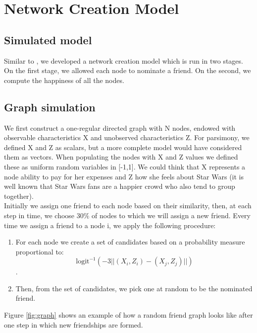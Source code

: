 \documentclass[11pt]{article}
\begin{document}
\section{Network Creation Model}
\label{Network Creation Model}

\subsection{Simulated model}

Similar to \cite{shalizi2011homophily}, we developed a network creation model which is run in two stages. On the first stage, we allowed each node to nominate a friend. On the second, we compute the happiness of all the nodes.

\subsection{Graph simulation}

We first construct a one-regular directed graph with N nodes, endowed with observable characteristics X and unobserved characteristics Z. For parsimony, we defined X and Z as scalars, but a more complete model would have considered them as vectors. When populating the nodes with X and Z values we defined these as uniform random variables in [-1,1]. We could think that X represents a node ability to pay for her expenses and Z how she feels about Star Wars (it is well known that Star Wars fans are a happier crowd who also tend to group together). \\

Initially we assign one friend to each node based on their similarity, then, at each step in time, we choose $30\%$ of nodes to which we will assign a new friend. Every time we assign a friend to a node i, we apply the following procedure:

\begin{enumerate}
\item For each node we create a set of candidates based on a probability measure proportional to: $$\text{logit}^{-1} \left(-3||(X_i,Z_i)-(X_j,Z_j)||\right)$$.
\item Then, from the set of candidates, we pick one at random to be the nominated friend.
\end{enumerate}

Figure \ref{fig:graph} shows an example of how a random friend graph looks like after one step in which new friendships are formed.
\end{document}

